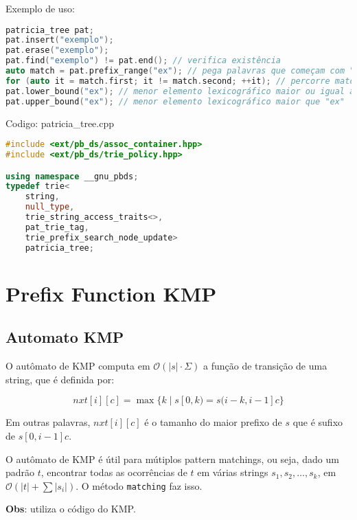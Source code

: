 \documentclass[10pt, a4paper, oneside]{book}
\begin{document}
Exemplo de uso:



\begin{lstlisting}[language=C++]
patricia_tree pat;
pat.insert("exemplo");
pat.erase("exemplo");
pat.find("exemplo") != pat.end(); // verifica existência
auto match = pat.prefix_range("ex"); // pega palavras que começam com "ex"
for (auto it = match.first; it != match.second; ++it); // percorre match
pat.lower_bound("ex"); // menor elemento lexicográfico maior ou igual a "ex"
pat.upper_bound("ex"); // menor elemento lexicográfico maior que "ex"
\end{lstlisting}

\hfill

Codigo: patricia\_tree.cpp

\begin{lstlisting}[language=C++]
#include <ext/pb_ds/assoc_container.hpp>
#include <ext/pb_ds/trie_policy.hpp>

using namespace __gnu_pbds;
typedef trie<
    string,
    null_type,
    trie_string_access_traits<>,
    pat_trie_tag,
    trie_prefix_search_node_update>
    patricia_tree;
\end{lstlisting}
\hfill

\section{Prefix Function KMP}
\subsection{Automato KMP}


O autômato de KMP computa em $\mathcal{O}(|s| \cdot \Sigma)$ a função de transição de uma string, que é definida por:



$$ nxt[i][c] = \max\{k \mid s[0,k) = s(i-k,i-1]c\} $$



Em outras palavras, $nxt[i][c]$ é o tamanho do maior prefixo de $s$ que é sufixo de $s[0,i-1]c$.



O autômato de KMP é útil para mútiplos pattern matchings, ou seja, dado um padrão $t$, encontrar todas as ocorrências de $t$ em várias strings $s_1, s_2, \dots, s_k$, em $\mathcal{O}(|t| + \sum |s_i|)$. O método \texttt{matching} faz isso.



\textbf{Obs}: utiliza o código do KMP.
\hfill
\end{document}
